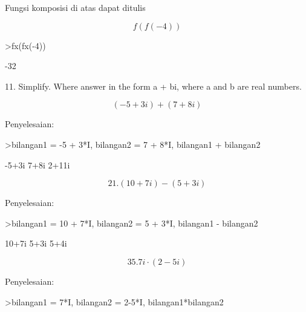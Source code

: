 \documentclass[a4paper,10pt]{article}
\begin{document}
\begin{eulernotebook}
\begin{eulercomment}
\begin{eulercomment}
\begin{eulercomment}
\begin{eulercomment}
\begin{eulercomment}
\begin{eulercomment}
\begin{eulercomment}
\begin{eulercomment}
\begin{eulercomment}
Fungsi komposisi di atas dapat ditulis\\
\end{eulercomment}
\begin{eulerformula}
\[
f(f(-4))
\]
\end{eulerformula}
\begin{eulerprompt}
>fx(fx(-4))
\end{eulerprompt}
\begin{euleroutput}
  -32
\end{euleroutput}
\begin{eulercomment}
11. Simplify. Where answer in the form a + bi, where a and b are real
numbers.\\
\end{eulercomment}
\begin{eulerformula}
\[
(-5+3i) + (7+8i)
\]
\end{eulerformula}
\begin{eulercomment}
Penyelesaian:
\end{eulercomment}
\begin{eulerprompt}
>bilangan1 = -5 + 3*I, bilangan2 = 7 + 8*I, bilangan1 + bilangan2
\end{eulerprompt}
\begin{euleroutput}
  -5+3i
  7+8i
  2+11i
\end{euleroutput}
\begin{eulercomment}
\end{eulercomment}
\begin{eulerformula}
\[
21. (10+7i)-(5+3i)
\]
\end{eulerformula}
\begin{eulercomment}
Penyelesaian:
\end{eulercomment}
\begin{eulerprompt}
>bilangan1 = 10 + 7*I, bilangan2 = 5 + 3*I, bilangan1 - bilangan2
\end{eulerprompt}
\begin{euleroutput}
  10+7i
  5+3i
  5+4i
\end{euleroutput}
\begin{eulercomment}
\end{eulercomment}
\begin{eulerformula}
\[
35. 7i\cdot (2-5i)
\]
\end{eulerformula}
\begin{eulercomment}
Penyelesaian:
\end{eulercomment}
\begin{eulerprompt}
>bilangan1 = 7*I, bilangan2 = 2-5*I, bilangan1*bilangan2

\end{eulerprompt}
\end{eulercomment}
\end{eulercomment}
\end{eulercomment}
\end{eulercomment}
\end{eulercomment}
\end{eulercomment}
\end{eulercomment}
\end{eulercomment}
\end{eulernotebook}
\end{document}

